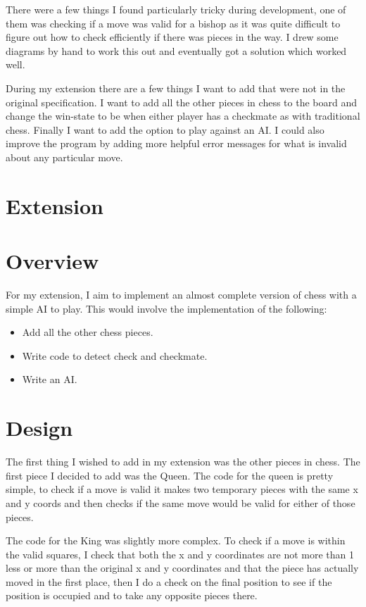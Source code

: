 \documentclass[a4paper]{article}
\begin{document}
There were a few things I found particularly tricky during development, one of them was checking if a move was valid for a bishop as it was quite difficult to figure out how to check efficiently if there was pieces in the way. I drew some diagrams by hand to work this out and eventually got a solution which worked well.

During my extension there are a few things I want to add that were not in the original specification. I want to add all the other pieces in chess to the board and change the win-state to be when either player has a checkmate as with traditional chess. Finally I want to add the option to play against an AI. I could also improve the program by adding more helpful error messages for what is invalid about any particular move.

\section*{Extension}
\section*{Overview}
For my extension, I aim to implement an almost complete version of chess with a simple AI to play. This would involve the implementation of the following: \begin{itemize}
\item Add all the other chess pieces.
\item Write code to detect check and checkmate.
\item Write an AI.
\end{itemize}
\section*{Design}
The first thing I wished to add in my extension was the other pieces in chess. The first piece I decided to add was the Queen. The code for the queen is pretty simple, to check if a move is valid it makes two temporary pieces with the same x and y coords and then checks if the same move would be valid for either of those pieces.

The code for the King was slightly more complex. To check if a move is within the valid squares, I check that both the x and y coordinates are not more than 1 less or more than the original x and y coordinates and that the piece has actually moved in the first place, then I do a check on the final position to see if the position is occupied and to take any opposite pieces there.
\end{document}
